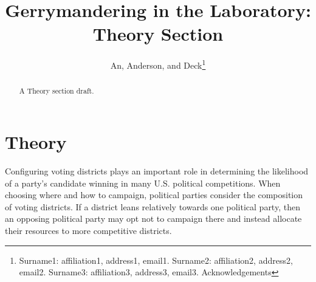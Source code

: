 \documentclass[AER]{AEA}
\begin{document}
\title{Gerrymandering in the Laboratory: Theory Section}
\author{An,  Anderson, and Deck\thanks{Surname1: affiliation1, address1, email1. 
Surname2: affiliation2, address2, email2. Surname3: affiliation3, address3, email3. Acknowledgements}}

\begin{abstract}
A Theory section draft.
\end{abstract}


\maketitle


\section{Theory}
\label{section:Theory}

Configuring voting districts plays an important role in determining the likelihood of a party's candidate winning in many U.S. political competitions. When choosing where and how to campaign, political parties consider the composition of voting districts. If a district leans relatively towards one political party, then an opposing political party may opt not to campaign there and instead allocate their resources to more competitive districts. 
\end{document}
